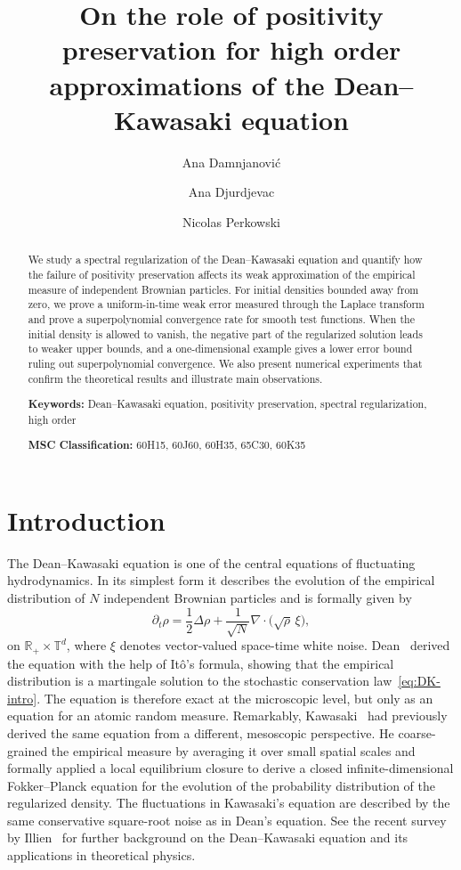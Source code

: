 \documentclass[a4paper,12pt]{article}
\title{On the role of positivity preservation for high order approximations of the Dean--Kawasaki equation}
\date{}
\author[1]{Ana Damnjanovi\'c}
\author[2]{Ana Djurdjevac}
\author[1,3]{Nicolas Perkowski}
\affil[1]{Freie Universit\"at Berlin, Arnimallee 7, 14195 Berlin, Germany}
\affil[2]{University of Oxford, Mathematical Institute, Oxford, UK }
\affil[3]{Max Planck Institute for Mathematics in the Sciences, Leipzig, Germany}
\newcommand{\keywords}[1]{%
  \par\smallskip
  \noindent\textbf{Keywords: }#1
}
\newcommand{\MSC}[2][]{%
  \par\smallskip
  \noindent\textbf{MSC Classification: }#2
}
\newcommand{\R}{\mathbb{R}}
\newcommand{\T}{\mathbb{T}}
\begin{document}
\maketitle
\begin{abstract}

We study a spectral regularization of the Dean--Kawasaki equation and quantify how the failure of positivity preservation affects its weak approximation of the empirical measure of independent Brownian particles.  For initial densities bounded away from zero, we prove a uniform-in-time weak error 
measured through the Laplace transform and prove a superpolynomial convergence rate for smooth test functions. When the initial density is allowed to vanish, the negative part of the regularized solution leads to weaker upper bounds, and a one-dimensional example gives a lower error bound ruling out superpolynomial convergence. 
We also present numerical experiments that confirm the theoretical results and illustrate  main  observations.

\keywords{Dean--Kawasaki equation, positivity preservation, spectral regularization, high order}


\MSC[]{60H15, 60J60, 60H35, 65C30, 60K35}
\end{abstract}


\section*{Introduction}

The Dean--Kawasaki equation is one of the central equations of fluctuating
hydrodynamics. In its simplest form it describes the evolution of the empirical
distribution of $N$ independent Brownian particles and is formally given by
\begin{equation}\label{eq:DK-intro}
    \partial_t \rho
    =
    \frac12 \Delta \rho
    +
    \frac1{\sqrt N}\nabla\cdot\bigl(\sqrt{\rho}\,\xi\bigr),
\end{equation}
on $\R_+ \times \T^d$, where $\xi$ denotes vector-valued space-time white noise. 
Dean~\cite{Dean1996} derived the equation with the help of It\^o's formula, showing that the empirical distribution is a martingale solution to the  stochastic conservation law~\eqref{eq:DK-intro}. The equation is therefore exact
at the microscopic level, but only as an equation for an atomic random measure.
Remarkably, Kawasaki~\cite{Kawasaki1994} had previously derived the same equation from a different, mesoscopic perspective. He coarse-grained the empirical measure by averaging it over small spatial scales and formally applied a local equilibrium closure to derive a closed infinite-dimensional Fokker--Planck equation for the evolution of the probability distribution of the regularized density. The fluctuations in Kawasaki's equation are described by the same conservative square-root noise as in Dean's equation. See the recent survey by Illien~\cite{Illien2025} for further background on the Dean--Kawasaki equation and its applications in theoretical physics.
\end{document}
